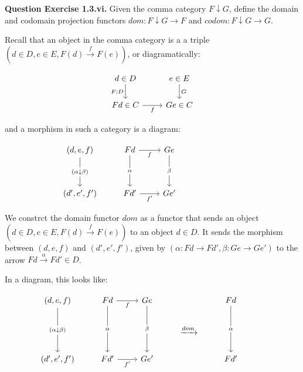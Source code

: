 \documentclass[11pt]{report}
\newcommand*{\question}[1]{\leavevmode\newline \textbf{Question #1.}}
\newcommand{\comma}{\downarrow}
\begin{document}
\question{Exercise 1.3.vi} Given the comma category $F \downarrow G$, define the domain and codomain projection functors $dom: F \comma G \rightarrow F$
  and $codom: F \comma G \rightarrow G$.


Recall that an object in the comma category is a a triple $(d \in D, e \in E, F(d) \xrightarrow{f} F(e))$, or diagramatically:

\[\begin{tikzcd}
	{d \in D} & {e \in E} \\
	{Fd\in C} & {Ge \in C}
	\arrow["{F: D }"', from=1-1, to=2-1]
	\arrow["G", from=1-2, to=2-2]
	\arrow["f"', from=2-1, to=2-2]
\end{tikzcd}\]

and a morphism in such a category is a diagram:

\[\begin{tikzcd}
	{(d, e,f)} & Fd & Ge \\
	\\
	{(d', e',f')} & {Fd'} & {Ge'} &&& {}
	\arrow["{f'}"', from=3-2, to=3-3]
	\arrow["f"', from=1-2, to=1-3]
	\arrow["\alpha"{description}, from=1-2, to=3-2]
	\arrow["{\beta }"{description}, from=1-3, to=3-3]
	\arrow["{(\alpha \downarrow \beta)}"{description}, from=1-1, to=3-1]
\end{tikzcd}\]

We constrct the domain functor $dom$ as a functor that sends an object $(d \in D, e \in E, F(d) \xrightarrow{f} F(e))$ to an object $d \in D$.
It sends the morphism between $(d, e, f)$ and $(d', e', f')$, given by $(\alpha : Fd \rightarrow Fd', \beta: Ge \rightarrow Ge')$ to
the arrow $Fd \xrightarrow{\alpha} Fd' \in D$.

In a diagram, this looks like:

\[\begin{tikzcd}
	{(d, e,f)} & Fd & Ge && Fd \\
	&&& {\xrightarrow{dom}} \\
	{(d', e',f')} & {Fd'} & {Ge'} && {Fd'} & {}
	\arrow["{f'}"', from=3-2, to=3-3]
	\arrow["f"', from=1-2, to=1-3]
	\arrow["\alpha"{description}, from=1-2, to=3-2]
	\arrow["{\beta }"{description}, from=1-3, to=3-3]
	\arrow["{(\alpha \downarrow \beta)}"{description}, from=1-1, to=3-1]
	\arrow["\alpha"{description}, from=1-5, to=3-5]
\end{tikzcd}\]
\end{document}
